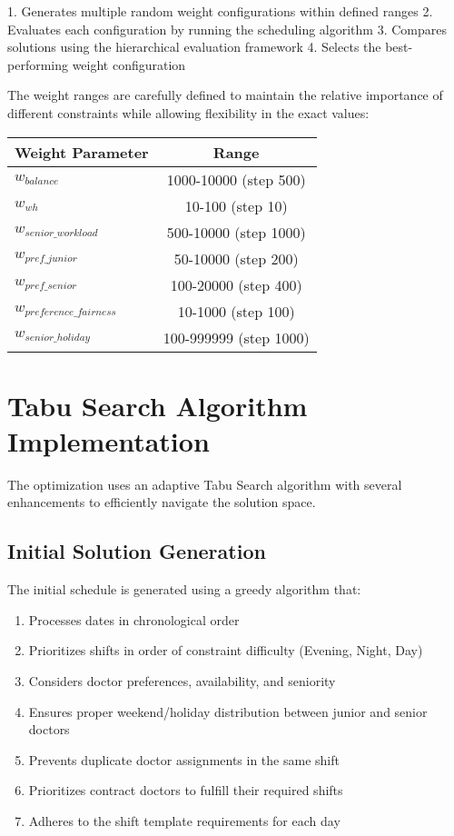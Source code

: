 \documentclass[12pt]{article}
\begin{document}
1. Generates multiple random weight configurations within defined ranges
2. Evaluates each configuration by running the scheduling algorithm
3. Compares solutions using the hierarchical evaluation framework
4. Selects the best-performing weight configuration

The weight ranges are carefully defined to maintain the relative importance of different constraints while allowing flexibility in the exact values:

\begin{center}
\begin{tabular}{|l|c|}
\hline
\textbf{Weight Parameter} & \textbf{Range} \\
\hline
$w_{balance}$ & 1000-10000 (step 500) \\
$w_{wh}$ & 10-100 (step 10) \\
$w_{senior\_workload}$ & 500-10000 (step 1000) \\
$w_{pref\_junior}$ & 50-10000 (step 200) \\
$w_{pref\_senior}$ & 100-20000 (step 400) \\
$w_{preference\_fairness}$ & 10-1000 (step 100) \\
$w_{senior\_holiday}$ & 100-999999 (step 1000) \\
\hline
\end{tabular}
\end{center}

\section{Tabu Search Algorithm Implementation}

The optimization uses an adaptive Tabu Search algorithm with several enhancements to efficiently navigate the solution space.

\subsection{Initial Solution Generation}

The initial schedule is generated using a greedy algorithm that:
\begin{enumerate}
    \item Processes dates in chronological order
    \item Prioritizes shifts in order of constraint difficulty (Evening, Night, Day)
    \item Considers doctor preferences, availability, and seniority
    \item Ensures proper weekend/holiday distribution between junior and senior doctors
    \item Prevents duplicate doctor assignments in the same shift
    \item Prioritizes contract doctors to fulfill their required shifts
    \item Adheres to the shift template requirements for each day
\end{enumerate}
\end{document}
